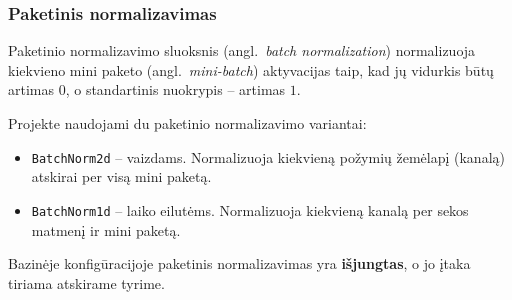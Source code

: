 \subsubsection{Paketinis normalizavimas}
\label{subsubsec:paketinis_normalizavimas}

Paketinio normalizavimo sluoksnis (angl.~\textit{batch normalization}) normalizuoja kiekvieno mini paketo (angl.~\textit{mini-batch}) aktyvacijas taip, kad jų vidurkis būtų artimas $0$, o standartinis nuokrypis – artimas $1$.

Projekte naudojami du paketinio normalizavimo variantai:
\begin{itemize}
    \item \texttt{BatchNorm2d} – vaizdams. Normalizuoja kiekvieną požymių žemėlapį (kanalą) atskirai per visą mini paketą.
    \item \texttt{BatchNorm1d} – laiko eilutėms. Normalizuoja kiekvieną kanalą per sekos matmenį ir mini paketą.
\end{itemize}

Bazinėje konfigūracijoje paketinis normalizavimas yra \textbf{išjungtas}, o jo įtaka tiriama atskirame tyrime.

